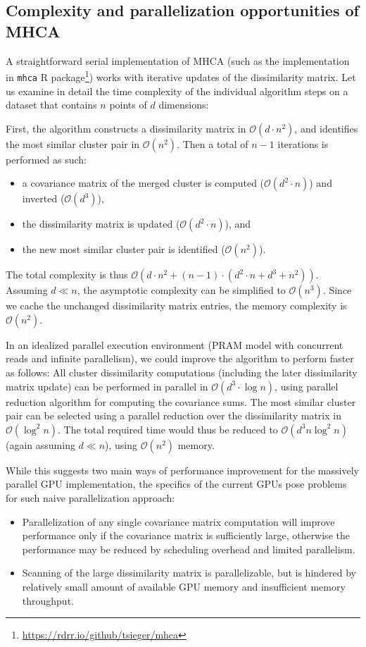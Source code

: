 \subsection{Complexity and parallelization opportunities of MHCA}

A straightforward serial implementation of MHCA (such as the implementation in \texttt{mhca} R package\footnote{\url{https://rdrr.io/github/tsieger/mhca}}) works with iterative updates of the dissimilarity matrix.
Let us examine in detail the time complexity of the individual algorithm steps on a dataset that contains $n$ points of $d$ dimensions:

First, the algorithm constructs a dissimilarity matrix in $\mathcal{O}(d\cdot n^2)$, and identifies the most similar cluster pair in $\mathcal{O}(n^2)$. Then a total of $n-1$ iterations is performed as such:
\begin{itemize}
  \item a covariance matrix of the merged cluster is computed ($\mathcal{O}(d^2\cdot n)$) and inverted ($\mathcal{O}(d^3)$),
  \item the dissimilarity matrix is updated ($\mathcal{O}(d^2\cdot n)$), and
  \item the new most similar cluster pair is identified ($\mathcal{O}(n^2)$).
\end{itemize}

The total complexity is thus $\mathcal{O}(d\cdot n^2 + (n-1) \cdot (d^2\cdot n + d^3 + n^2))$.
Assuming $d\ll n$, the asymptotic complexity can be simplified to $\mathcal{O}(n^3)$.
Since we cache the unchanged dissimilarity matrix entries, the memory complexity is $\mathcal{O}(n^2)$.

In an idealized parallel execution environment (PRAM model with concurrent reads and infinite parallelism), we could improve the algorithm to perform faster as follows:
All cluster dissimilarity computations (including the later dissimilarity matrix update) can be performed in parallel in $\mathcal{O}{(d^3\cdot \log n)}$, using parallel reduction algorithm for computing the covariance sums.
The most similar cluster pair can be selected using a parallel reduction over the dissimilarity matrix in $\mathcal{O}(\log^2 n)$.
The total required time would thus be reduced to $\mathcal{O}(d^3 n\log^2 n)$ (again assuming $d\ll n$), using $\mathcal{O}(n^2)$ memory.

While this suggests two main ways of performance improvement for the massively parallel GPU implementation, the specifics of the current GPUs pose problems for such naive parallelization approach:
\begin{itemize}
	\item Parallelization of any single covariance matrix computation will improve performance only if the covariance matrix is sufficiently large, otherwise the performance may be reduced by scheduling overhead and limited parallelism.
	\item Scanning of the large dissimilarity matrix is parallelizable, but is hindered by relatively small amount of available GPU memory and insufficient memory throughput.
\end{itemize}

